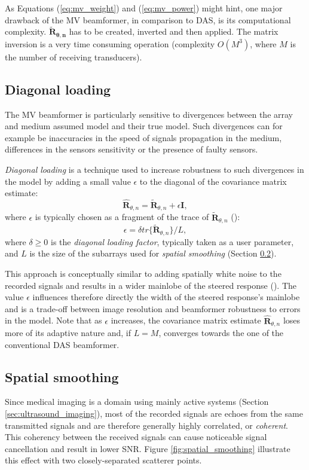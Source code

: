 As Equations (\ref{eq:mv_weight}) and (\ref{eq:mv_power}) might hint, one major drawback of the MV beamformer, in comparison to DAS, is its computational complexity.
$\boldsymbol{\tilde{R}_{\theta,n}}$ has to be created, inverted and then applied. The matrix inversion is a very time consuming operation (complexity $O(M^3)$, where $M$ is the number of receiving transducers).

\subsection{Diagonal loading}
\label{sec:diagonal_loading}
The MV beamformer is particularly sensitive to divergences between the array and medium assumed model and their true model. Such divergences can for example be inaccuracies in the speed of signals propagation in the medium, differences in the sensors sensitivity or the presence of faulty sensors.

\textit{Diagonal loading} is a technique used to increase robustness to such divergences in the model by adding a small value $\epsilon$ to the diagonal of the covariance matrix estimate:
\begin{equation}
    \boldsymbol{\hat{R}}_{\theta, n} = \boldsymbol{\tilde{R}}_{\theta, n} + \epsilon \boldsymbol{I},
\end{equation}
\noindent
where $\epsilon$ is typically chosen as a fragment of the trace of $\boldsymbol{\tilde{R}}_{\theta, n}$ (\cite{Synnevag_adaptive}):
\begin{equation}
    \epsilon = \delta tr\{\boldsymbol{\tilde{R}}_{\theta, n} \} / L,
\end{equation}
\noindent
where $\delta \geq 0$ is the \textit{diagonal loading factor}, typically taken as a user parameter, and $L$ is the size of the subarrays used for \textit{spatial smoothing} (Section \ref{sec:spatial_smoothing}).

This approach is conceptually similar to adding spatially white noise to the recorded signals and results in a wider mainlobe of the steered response (\cite{Synnevag_adaptive}). The value $\epsilon$ influences therefore directly the width of the steered response's mainlobe and is a trade-off between image resolution and beamformer robustness to errors in the model. Note that as $\epsilon$ increases, the covariance matrix estimate $\boldsymbol{\hat{R}}_{\theta, n}$ loses more of its adaptive nature and, if $L=M$, converges towards the one of the conventional DAS beamformer.

\subsection{Spatial smoothing}
\label{sec:spatial_smoothing}
Since medical imaging is a domain using mainly active systems (Section \ref{sec:ultrasound_imaging}), most of the recorded signals are echoes from the same transmitted signals and are therefore generally highly correlated, or \textit{coherent}. This coherency between the received signals can cause noticeable signal cancellation and result in lower SNR.
Figure \ref{fig:spatial_smoothing} illustrate this effect with two closely-separated scatterer points.

